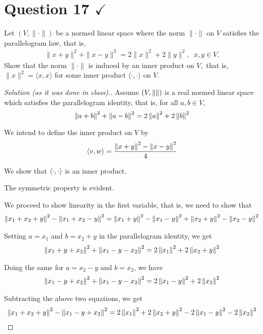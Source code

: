 \section{Question 17 \texorpdfstring{$\checkmark$}{}}
\horz
Let $(V,\| \cdot\|)$ be a normed linear space where the norm $\|\cdot\|$ on $V$ satisfies the parallelogram law, that is,
\begin{align*}
\|x+y\|^2 + \|x-y\|^2= 2 \|x\|^2 + 2 \|y\|^2,\,\,\,x,y\in V.
\end{align*}
Show that the norm $\|\cdot\|$ is induced by an inner product on $V,$ that is, $\|x\|^2= \langle x,x\rangle$ for some inner product $\langle \cdot,\cdot \rangle$ on $V.$
\horz
\begin{proof}[Solution (as it was done in class).]
Assume $\left( V, \left\lVert  \right\rVert \right)$ is a real normed linear space which satisfies the parallelogram identity, that is, for all $a,b \in V$, 
\begin{equation*}
    \left\lVert a+b \right\rVert^{2} + \left\lVert a-b \right\rVert^{2} = 2\left\lVert a \right\rVert^{2} +2 \left\lVert b \right\rVert^{2}
\end{equation*}

We intend to define the inner product on $V$ by
\begin{align*}
    \left\langle v,w \right\rangle = \frac{\left\lVert x+y \right\rVert^{2} - \left\lVert x-y \right\rVert^{2}}{4}
\end{align*}

We show that $\left\langle \cdot, \cdot \right\rangle$ is an inner product.

The symmetric property is evident.

We proceed to show linearity in the first variable, that is, we need to show that 
\begin{align*}
    \left\lVert x_{1} + x_{2} + y \right\rVert^{2} - \left\lVert x_{1}+x_{2}-y \right\rVert^{2} = \left\lVert x_{1} + y \right\rVert^2-\left\lVert x_{1}-y \right\rVert^{2} + \left\lVert x_{2}+y \right\rVert^{2} - \left\lVert x_{2}-y \right\rVert^{2}
\end{align*}

Setting $a=x_{1} $ and $b=x_{2}+y$ in the parallelogram identity, we get
\begin{align*}
    \left\lVert x_{1} + y + x_{2} \right\rVert^{2} + \left\lVert x_{1} - y - x_{2} \right\rVert^{2} = 2 \left\lVert x_{1}  \right\rVert ^{2} + 2 \left\lVert x_{2} + y \right\rVert^{2}
\end{align*}

Doing the same for $a=x_{2} -y $ and $b=x_{2}$, we have
\begin{align*}
    \left\lVert x_{1} - y + x_{2} \right\rVert^{2} + \left\lVert x_{1} - y - x_{2} \right\rVert^{2} = 2 \left\lVert x_{1} -y \right\rVert ^{2} + 2 \left\lVert x_{2} \right\rVert^{2}
\end{align*}

Subtracting the above two equations, we get
\begin{align*}
    \left\lVert x_{1} + x_{2} + y \right\rVert^{2} - \left\lVert x_{1} - y + x_{2} \right\rVert ^{2} = 2\left\lVert x_{1} \right\rVert^{2} + 2 \left\lVert x_{2} + y \right\rVert ^{2} - 2 \left\lVert x_{1} - y \right\rVert^{2} - 2 \left\lVert x_{2} \right\rVert^{2}
\end{align*}
 

\end{proof}
